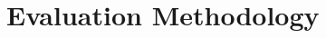 \documentclass[conference]{IEEEtran}
\begin{document}

\section {Evaluation Methodology} \label{Evaluation Methodology}
\end{document}
